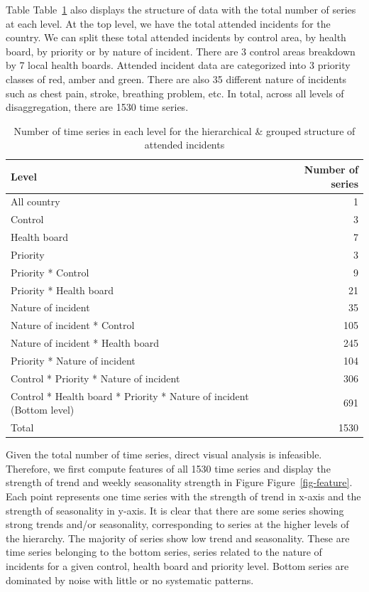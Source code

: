 \documentclass[
  authoryear,
  preprint,
  3p]{elsarticle}
\begin{document}
Table Table~\ref{tbl-hierarchy} also displays the structure of data with
the total number of series at each level. At the top level, we have the
total attended incidents for the country. We can split these total
attended incidents by control area, by health board, by priority or by
nature of incident. There are 3 control areas breakdown by 7 local
health boards. Attended incident data are categorized into 3 priority
classes of red, amber and green. There are also 35 different nature of
incidents such as chest pain, stroke, breathing problem, etc. In total,
across all levels of disaggregation, there are 1530 time series.

\hypertarget{tbl-hierarchy}{}
\begin{table}
\caption{\label{tbl-hierarchy}Number of time series in each level for the hierarchical \& grouped
structure of attended incidents }\tabularnewline

\centering
\begin{tabular}{lr}
\toprule
Level & Number of series\\
\midrule
All country & 1\\
Control & 3\\
Health board & 7\\
Priority & 3\\
Priority * Control & 9\\
\addlinespace
Priority * Health board & 21\\
Nature of incident & 35\\
Nature of incident * Control & 105\\
Nature of incident * Health board & 245\\
Priority * Nature of incident & 104\\
\addlinespace
Control * Priority * Nature of incident & 306\\
Control * Health board * Priority * Nature of incident (Bottom level) & 691\\
Total & 1530\\
\bottomrule
\end{tabular}
\end{table}

Given the total number of time series, direct visual analysis is
infeasible. Therefore, we first compute features of all 1530 time series
and display the strength of trend and weekly seasonality strength in
Figure Figure~\ref{fig-feature}. Each point represents one time series
with the strength of trend in x-axis and the strength of seasonality in
y-axis. It is clear that there are some series showing strong trends
and/or seasonality, corresponding to series at the higher levels of the
hierarchy. The majority of series show low trend and seasonality. These
are time series belonging to the bottom series, series related to the
nature of incidents for a given control, health board and priority
level. Bottom series are dominated by noise with little or no systematic
patterns.
\end{document}

